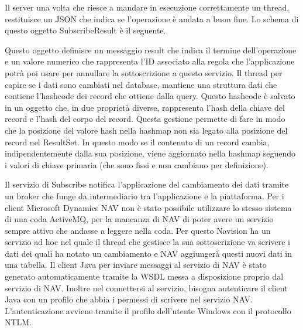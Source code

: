 Il server una volta che riesce a mandare in esecuzione correttamente un thread, restituisce un JSON che indica se l’operazione è andata a buon fine. Lo schema di questo oggetto SubscribeResult è il seguente.
\begin{center}
		{\selectfont
			
		}
\end{center}
Questo oggetto definisce un messaggio result che indica il termine dell’operazione e un valore numerico che rappresenta l’ID associato alla regola che l'applicazione potrà poi usare per annullare la sottoscrizione a questo servizio.
Il thread per capire se i dati sono cambiati nel database, mantiene una struttura dati che contiene l’hashcode dei record che ottiene dalla query. Questo hashcode è salvato in un oggetto che, in due proprietà diverse, rappresenta l’hash della chiave del record e l’hash del corpo del record. Questa gestione permette di fare in modo che la posizione del valore hash nella hashmap non sia legato alla posizione del record nel ResultSet. In questo modo se il contenuto di un record cambia, indipendentemente dalla sua posizione, viene aggiornato nella hashmap seguendo i valori di chiave primaria (che sono fissi e non cambiano per definizione).

Il servizio di Subscribe notifica l'applicazione del cambiamento dei dati tramite un broker che funge da intermediario tra l'applicazione e la piattaforma. Per i client Microsoft Dynamics NAV non è stato possibile utilizzare lo stesso sistema di una coda ActiveMQ, per la mancanza di NAV di poter avere un servizio sempre attivo che andasse a leggere nella coda. Per questo Navision ha un servizio ad hoc nel quale il thread che gestisce la sua sottoscrizione va scrivere i dati dei quali ha notato un cambiamento e NAV aggiungerà questi nuovi dati in una tabella. Il client Java per inviare messaggi al servizio di NAV è stato generato automaticamente tramite la WSDL messa a disposizione proprio dal servizio di NAV. Inoltre nel connettersi al servizio, bisogna autenticare il client Java con un profilo che abbia i permessi di scrivere nel servizio NAV. L’autenticazione avviene tramite il profilo dell'utente Windows con il protocollo NTLM.

